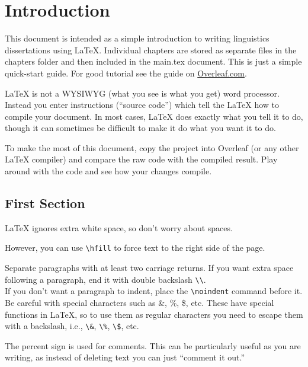 \chapter{Introduction}\label{chap:intro}
This document is intended as a simple introduction to writing linguistics dissertations using {\LaTeX}. Individual chapters are stored as separate files in the chapters folder and then included in the main.tex document.  This is just a simple quick-start guide. For good tutorial see the guide on 
\href{https://www.overleaf.com/learn/latex/How_to_Write_a_Thesis_in_LaTeX_(Part_1):_Basic_Structure}{Overleaf.com}.

{\LaTeX} is not a WYSIWYG (what you see is what you get) word processor. Instead you enter instructions (``source code'') which tell the {\LaTeX} how to compile your document. In most cases, {\LaTeX} does exactly what you tell it to do, though it can sometimes be difficult to make it do what you want it to do. 

To make the most of this document, copy the project into Overleaf (or any other {\LaTeX} compiler) and compare the raw code with the compiled result. Play around with the code and see how your changes compile. 

\section{First Section}\label{sec:fist_section_label}


{\LaTeX} ignores extra white space, so don't worry about spaces. 

However, you can use \verb|\hfill| \hfill to force text to the right side of the page. 

Separate paragraphs with at least two carriage returns. If you want extra space following a paragraph, end it with double backslash \verb|\\|. \\

\noindent
If you don't want a paragraph to indent, place the \verb|\noindent| command before it.\\

Be careful with special characters such as  \&, \%, \$, etc. These have special functions in {\LaTeX}, so to use them as regular characters you need to escape them with a backslash, i.e., \verb|\&|, \verb|\%|, \verb|\$|, etc.

The percent sign is used for comments. This can be particularly useful as you are writing, as instead of deleting text you can just ``comment it out.''

